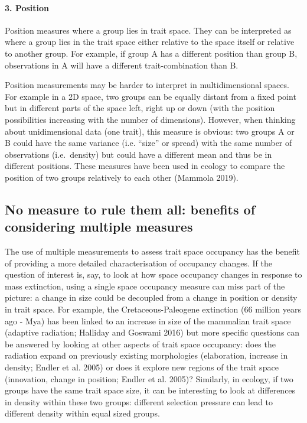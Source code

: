 \documentclass[]{article}
\let\oldparagraph\paragraph
\renewcommand{\paragraph}[1]{\oldparagraph{#1}\mbox{}}
\begin{document}
\paragraph{3. Position}\label{position}

Position measures where a group lies in trait space. They can be
interpreted as where a group lies in the trait space either relative to
the space itself or relative to another group. For example, if group A
has a different position than group B, observations in A will have a
different trait-combination than B.

Position measurements may be harder to interpret in multidimensional
spaces. For example in a 2D space, two groups can be equally distant
from a fixed point but in different parts of the space left, right up or
down (with the position possibilities increasing with the number of
dimensions). However, when thinking about unidimensional data (one
trait), this measure is obvious: two groups A or B could have the same
variance (i.e. ``size'' or spread) with the same number of observations
(i.e.~density) but could have a different mean and thus be in different
positions. These measures have been used in ecology to compare the
position of two groups relatively to each other (Mammola 2019).

\subsection{No measure to rule them all: benefits of considering
multiple
measures}\label{no-measure-to-rule-them-all-benefits-of-considering-multiple-measures}

The use of multiple measurements to assess trait space occupancy has the
benefit of providing a more detailed characterisation of occupancy
changes. If the question of interest is, say, to look at how space
occupancy changes in response to mass extinction, using a single space
occupancy measure can miss part of the picture: a change in size could
be decoupled from a change in position or density in trait space. For
example, the Cretaceous-Paleogene extinction (66 million years ago -
Mya) has been linked to an increase in size of the mammalian trait space
(adaptive radiation; Halliday and Goswami 2016) but more specific
questions can be answered by looking at other aspects of trait space
occupancy: does the radiation expand on previously existing morphologies
(elaboration, increase in density; Endler et al. 2005) or does it
explore new regions of the trait space (innovation, change in position;
Endler et al. 2005)? Similarly, in ecology, if two groups have the same
trait space size, it can be interesting to look at differences in
density within these two groups: different selection pressure can lead
to different density within equal sized groups.
\end{document}
